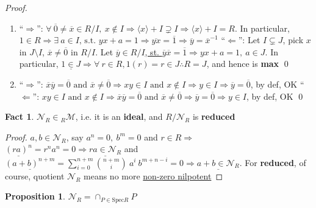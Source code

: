 \documentclass[12pt,a4paper]{article}
\theoremstyle{definition}
\newtheorem{proposition}{Proposition}
\newtheorem{fact}{Fact}
\begin{document}
\noindent\textit{Proof.}
  \begin{enumerate} [(1)]
    \item ``$\Rightarrow$'': $\forall\ \overline{0} \neq \overline{x} \in R/I,\ x \notin I \Rightarrow \langle x \rangle + I \supsetneq I \Rightarrow \langle x \rangle + I = R$. In particular, $1 \in R \Rightarrow \exists\ a \in I \text{, s.t. } yx + a = 1 \Rightarrow \overline{yx} = \overline{1} \Rightarrow \overline{y} = \overline{x}^{-1}$ \newline
    ``$\Leftarrow$'': Let $I \subsetneq J$, pick $x$ in $J \setminus I$, $\overline{x} \neq \overline{0}$ in $R/I$. Let \underline{$\overline{y} \in R/I$, st. $\overline{y}\overline{x} = \overline{1} \Rightarrow yx + a = 1,\ a \in J$}. In particular, $\underline{1 \in J} \Rightarrow \forall\ r \in R, 1(r) = r \in J \therefore R = J$, and hence is \textbf{max} \qed
    \item ``$\Rightarrow$'': $\overline{x}\overline{y} = \overline{0} \text{ and } \overline{x} \neq \overline{0} \Rightarrow xy \in I \text{ and } x \notin I \Rightarrow y \in I \Rightarrow \overline{y} = \overline{0}$, by def, OK \newline
    ``$\Leftarrow$'': $xy \in I \text{ and } x \notin I \Rightarrow \overline{x}\overline{y} = \overline{0} \text{ and } \overline{x} \neq \overline{0} \Rightarrow \overline{y} = \overline{0} \Rightarrow y \in I$, by def, OK \qed
  \end{enumerate}
\vspace{0.125em}

\begin{fact}
  $\mathcal{N}_R \in \text{}_R \mathcal{M}$, i.e. it is an \textbf{ideal}, and \underline{$R/\mathcal{N}_R$} is \textbf{reduced}
\end{fact}

\begin{proof}
  $a, b \in \mathcal{N}_R$, say $a^n = 0,\ b^m = 0$ and $r \in R \Rightarrow$ $\underline{(ra)^n} = r^n a^n = 0 \Rightarrow \underline{ra \in \mathcal{N}_R}$ and $\underline{(a + b)^{n + m}} = \sum_{i = 0}^{n + m} {{n + m}\choose{i}}\ a^i\ b^{m + n - i} = 0 \Rightarrow \underline{a + b \in \mathcal{N}_R}$. For \textbf{reduced}, of course, quotient $\mathcal{N}_R$ means no more \underline{non-zero nilpotent}
\end{proof}
\vspace{0.125em}

\begin{proposition}
  $\boxed{\mathcal{N}_R = \cap_{P \in \text{Spec}R} P}$
\end{proposition}
\end{document}
